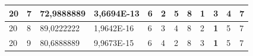 \documentclass[conference]{IEEEtran}
\begin{document}
\begin{table}[]
\begin{tabular}{|llll|llllllll|}
\multicolumn{1}{|l|}{20}                                                    & \multicolumn{1}{l|}{7}                                                        & \multicolumn{1}{l|}{72,9888889}                                                   & 3,6694E-13                     & \multicolumn{1}{l|}{6}                                                  & \multicolumn{1}{l|}{2}                                                  & \multicolumn{1}{l|}{5}                                                  & \multicolumn{1}{l|}{8}                                                  & \multicolumn{1}{l|}{\textbf{1}}                                         & \multicolumn{1}{l|}{3}                                                  & \multicolumn{1}{l|}{4}                                                  & 7                          \\ \hline
\multicolumn{1}{|l|}{20}                                                    & \multicolumn{1}{l|}{8}                                                        & \multicolumn{1}{l|}{89,0222222}                                                   & 1,9642E-16                     & \multicolumn{1}{l|}{6}                                                  & \multicolumn{1}{l|}{3}                                                  & \multicolumn{1}{l|}{4}                                                  & \multicolumn{1}{l|}{8}                                                  & \multicolumn{1}{l|}{2}                                                  & \multicolumn{1}{l|}{\textbf{1}}                                         & \multicolumn{1}{l|}{5}                                                  & 7                          \\ \hline
\multicolumn{1}{|l|}{20}                                                    & \multicolumn{1}{l|}{9}                                                        & \multicolumn{1}{l|}{80,6888889}                                                   & 9,9673E-15                     & \multicolumn{1}{l|}{6}                                                  & \multicolumn{1}{l|}{4}                                                  & \multicolumn{1}{l|}{2}                                                  & \multicolumn{1}{l|}{8}                                                  & \multicolumn{1}{l|}{3}                                                  & \multicolumn{1}{l|}{\textbf{1}}                                         & \multicolumn{1}{l|}{5}                                                  & 7                          \\ \hline
\end{tabular}
\end{table}
\end{document}
